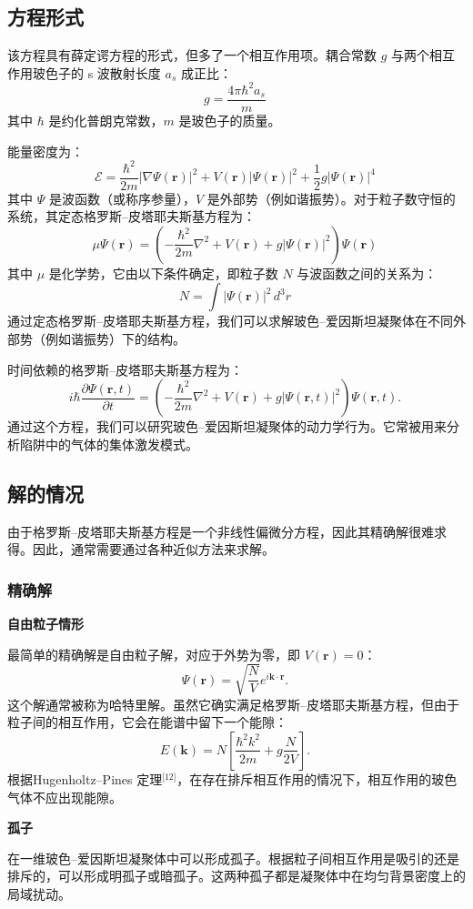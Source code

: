 \subsection{方程形式}
该方程具有薛定谔方程的形式，但多了一个相互作用项。耦合常数 $g$ 与两个相互作用玻色子的 s 波散射长度 $a_s$ 成正比：
$$
g = \frac{4\pi \hbar^2 a_s}{m}~
$$
其中 $\hbar$ 是约化普朗克常数，$m$ 是玻色子的质量。

能量密度为：
$$
\mathcal{E} = \frac{\hbar^2}{2m} |\nabla \Psi(\mathbf{r})|^2 + V(\mathbf{r}) |\Psi(\mathbf{r})|^2 + \frac{1}{2} g |\Psi(\mathbf{r})|^4~
$$
其中 $\Psi$ 是波函数（或称序参量），$V$ 是外部势（例如谐振势）。对于粒子数守恒的系统，其定态格罗斯–皮塔耶夫斯基方程为：
$$
\mu \Psi(\mathbf{r}) = \left( -\frac{\hbar^2}{2m} \nabla^2 + V(\mathbf{r}) + g |\Psi(\mathbf{r})|^2 \right) \Psi(\mathbf{r})~
$$
其中 $\mu$ 是化学势，它由以下条件确定，即粒子数 $N$ 与波函数之间的关系为：
$$
N = \int |\Psi(\mathbf{r})|^2 \, d^3 r~
$$
通过定态格罗斯–皮塔耶夫斯基方程，我们可以求解玻色–爱因斯坦凝聚体在不同外部势（例如谐振势）下的结构。

时间依赖的格罗斯–皮塔耶夫斯基方程为：
$$
i\hbar \frac{\partial \Psi(\mathbf{r}, t)}{\partial t} = \left( -\frac{\hbar^2}{2m} \nabla^2 + V(\mathbf{r}) + g |\Psi(\mathbf{r}, t)|^2 \right) \Psi(\mathbf{r}, t).~
$$
通过这个方程，我们可以研究玻色–爱因斯坦凝聚体的动力学行为。它常被用来分析陷阱中的气体的集体激发模式。
\subsection{解的情况}
由于格罗斯–皮塔耶夫斯基方程是一个非线性偏微分方程，因此其精确解很难求得。因此，通常需要通过各种近似方法来求解。
\subsubsection{精确解}
\textbf{自由粒子情形}

最简单的精确解是自由粒子解，对应于外势为零，即 $V(\mathbf{r}) = 0$：
$$
\Psi(\mathbf{r}) = \sqrt{\frac{N}{V}} e^{i\mathbf{k} \cdot \mathbf{r}}.~
$$
这个解通常被称为哈特里解。虽然它确实满足格罗斯–皮塔耶夫斯基方程，但由于粒子间的相互作用，它会在能谱中留下一个能隙：
$$
E(\mathbf{k}) = N\left[ \frac{\hbar^2 k^2}{2m} + g \frac{N}{2V} \right].~
$$
根据Hugenholtz–Pines 定理\(^\text{[12]}\)，在存在排斥相互作用的情况下，相互作用的玻色气体不应出现能隙。

\textbf{孤子}

在一维玻色–爱因斯坦凝聚体中可以形成孤子。根据粒子间相互作用是吸引的还是排斥的，可以形成明孤子或暗孤子。这两种孤子都是凝聚体中在均匀背景密度上的局域扰动。

